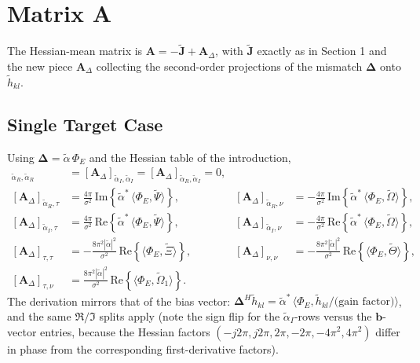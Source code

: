 \documentclass[11pt]{article}
\begin{document}
\section{Matrix A}

The Hessian-mean matrix is \(\bm{A} = -\tilde{\bm{J}} + \bm{A}_\Delta\), with \(\tilde{\bm{J}}\) exactly as in Section 1 and the new piece \(\bm{A}_\Delta\) collecting the second-order projections of the mismatch \(\bm{\Delta}\) onto \(\tilde{h}_{kl}\).

\subsection{Single Target Case}

Using \(\bm{\Delta} = \tilde{\alpha}\, \Phi_E\) and the Hessian table of the introduction,
\begin{align}
    [\bm{A}_\Delta]_{\tilde{\alpha}_R, \tilde{\alpha}_R} &= [\bm{A}_\Delta]_{\tilde{\alpha}_I, \tilde{\alpha}_I} = [\bm{A}_\Delta]_{\tilde{\alpha}_R, \tilde{\alpha}_I} = 0, \\
    [\bm{A}_\Delta]_{\tilde{\alpha}_R, \tau} &= \tfrac{4\pi}{\sigma^2}\, \mathrm{Im}\!\left\{ \tilde{\alpha}^*\, \langle \Phi_E, \tilde{\Psi}\rangle \right\}, &
    [\bm{A}_\Delta]_{\tilde{\alpha}_R, \nu} &= -\tfrac{4\pi}{\sigma^2}\, \mathrm{Im}\!\left\{ \tilde{\alpha}^*\, \langle \Phi_E, \tilde{\Omega}\rangle \right\}, \\
    [\bm{A}_\Delta]_{\tilde{\alpha}_I, \tau} &= \tfrac{4\pi}{\sigma^2}\, \mathrm{Re}\!\left\{ \tilde{\alpha}^*\, \langle \Phi_E, \tilde{\Psi}\rangle \right\}, &
    [\bm{A}_\Delta]_{\tilde{\alpha}_I, \nu} &= -\tfrac{4\pi}{\sigma^2}\, \mathrm{Re}\!\left\{ \tilde{\alpha}^*\, \langle \Phi_E, \tilde{\Omega}\rangle \right\}, \\
    [\bm{A}_\Delta]_{\tau, \tau} &= -\tfrac{8\pi^2 |\tilde{\alpha}|^2}{\sigma^2}\, \mathrm{Re}\!\left\{ \langle \Phi_E, \tilde{\Xi}\rangle \right\}, &
    [\bm{A}_\Delta]_{\nu, \nu} &= -\tfrac{8\pi^2 |\tilde{\alpha}|^2}{\sigma^2}\, \mathrm{Re}\!\left\{ \langle \Phi_E, \tilde{\Theta}\rangle \right\}, \\
    [\bm{A}_\Delta]_{\tau, \nu} &= \tfrac{8\pi^2 |\tilde{\alpha}|^2}{\sigma^2}\, \mathrm{Re}\!\left\{ \langle \Phi_E, \tilde{\Omega}_1\rangle \right\}. & &
\end{align}
The derivation mirrors that of the bias vector: \(\bm{\Delta}^H \tilde{h}_{kl} = \tilde{\alpha}^*\, \langle \Phi_E, \tilde{h}_{kl}/\text{(gain factor)} \rangle\), and the same \(\Re/\Im\) splits apply (note the sign flip for the \(\tilde{\alpha}_I\)-rows versus the \(\bm{b}\)-vector entries, because the Hessian factors \((-j2\pi, j2\pi, 2\pi, -2\pi, -4\pi^2, 4\pi^2)\) differ in phase from the corresponding first-derivative factors).
\end{document}
